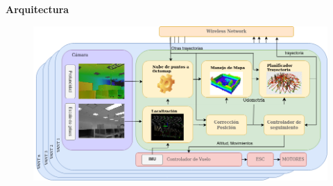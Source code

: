 \documentclass[
  24pt, %
  aspectratio=169, %
]{beamer}
\begin{document}
\begin{frame}
  \textbf{Arquitectura}
  \begin{figure}
    \centering
    \includegraphics[width=15cm]{arquitectura}
  \end{figure}
\end{frame}


    
    

    
\end{document}
